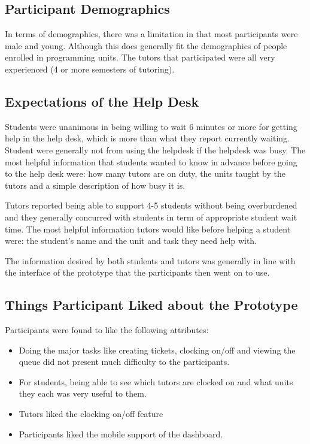 \documentclass[12pt,a4paper,]{article}
\providecommand{\tightlist}{%
  \setlength{\itemsep}{0pt}\setlength{\parskip}{0pt}}
\begin{document}
\subsection{Participant Demographics}\label{participant-demographics}

In terms of demographics, there was a limitation in that most
participants were male and young. Although this does generally fit the
demographics of people enrolled in programming units. The tutors that
participated were all very experienced (4 or more semesters of
tutoring).

\subsection{Expectations of the Help
Desk}\label{expectations-of-the-help-desk}

Students were unanimous in being willing to wait 6 minutes or more for
getting help in the help desk, which is more than what they report
currently waiting. Student were generally not from using the helpdesk if
the helpdesk was busy. The most helpful information that students wanted
to know in advance before going to the help desk were: how many tutors
are on duty, the units taught by the tutors and a simple description of
how busy it is.

Tutors reported being able to support 4-5 students without being
overburdened and they generally concurred with students in term of
appropriate student wait time. The most helpful information tutors would
like before helping a student were: the student's name and the unit and
task they need help with.

The information desired by both students and tutors was generally in
line with the interface of the prototype that the participants then went
on to use.

\subsection{Things Participant Liked about the
Prototype}\label{things-participant-liked-about-the-prototype}

Participants were found to like the following attributes:

\begin{itemize}
\tightlist
\item
  Doing the major tasks like creating tickets, clocking on/off and
  viewing the queue did not present much difficulty to the participants.
\item
  For students, being able to see which tutors are clocked on and what
  units they each was very useful to them.
\item
  Tutors liked the clocking on/off feature
\item
  Participants liked the mobile support of the dashboard.
\end{itemize}
\end{document}
